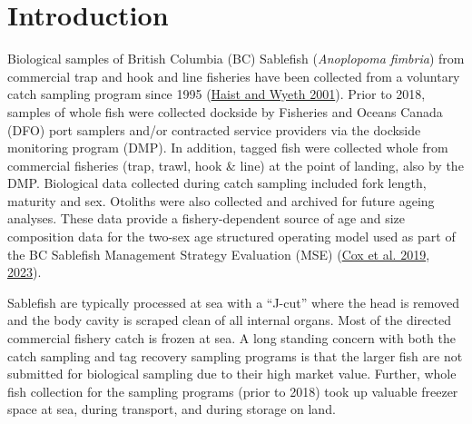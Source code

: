 \documentclass[12pt]{article}\usepackage[]{graphicx}\usepackage[]{color}
\begin{document}

\frontmatter


\renewcommand{\headrulewidth}{0.5pt}  %
\renewcommand{\footrulewidth}{0.5pt}  %

\newcommand{\lt}{\ensuremath <}
\newcommand{\gt}{\ensuremath >}

\newlength{\cslhangindent}
\setlength{\cslhangindent}{1.5em}
\newenvironment{cslreferences}%
  {}%
  {\par}

\hypertarget{introduction}{%
\section{Introduction}\label{introduction}}

Biological samples of British Columbia (BC) Sablefish (\emph{Anoplopoma fimbria}) from commercial trap and hook and line fisheries have been collected from a voluntary catch sampling program since 1995 (\protect\hyperlink{ref-Haist2001}{Haist and Wyeth 2001}). Prior to 2018, samples of whole fish were collected dockside by Fisheries and Oceans Canada (DFO) port samplers and/or contracted service providers via the dockside monitoring program (DMP). In addition, tagged fish were collected whole from commercial fisheries (trap, trawl, hook \& line) at the point of landing, also by the DMP. Biological data collected during catch sampling included fork length, maturity and sex. Otoliths were also collected and archived for future ageing analyses. These data provide a fishery-dependent source of age and size composition data for the two-sex age structured operating model used as part of the BC Sablefish Management Strategy Evaluation (MSE) (\protect\hyperlink{ref-Cox2019}{Cox et al. 2019}, \protect\hyperlink{ref-Cox2023}{2023}).

Sablefish are typically processed at sea with a ``J-cut'' where the head is removed and the body cavity is scraped clean of all internal organs. Most of the directed commercial fishery catch is frozen at sea. A long standing concern with both the catch sampling and tag recovery sampling programs is that the larger fish are not submitted for biological sampling due to their high market value. Further, whole fish collection for the sampling programs (prior to 2018) took up valuable freezer space at sea, during transport, and during storage on land.
\end{document}
